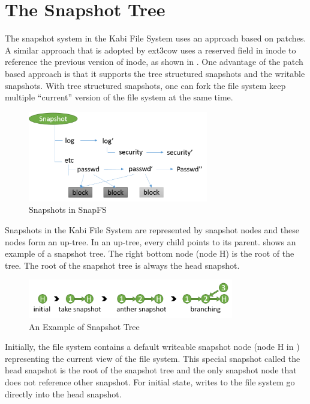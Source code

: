 \section{The Snapshot Tree}

    The snapshot system in the Kabi File System uses an approach based on patches. A similar approach that is adopted by ext3cow uses a reserved field in inode to reference the previous version of inode, as shown in . One advantage of the patch based approach is that it supports the tree structured snapshots and the writable snapshots. With tree structured snapshots, one can fork the file system keep multiple ``current'' version of the file system at the same time.

\begin{figure}[t]
\centering
\includegraphics[width=0.7\textwidth]{Chapter-4/figs/fig24.png}
\caption{Snapshots in SnapFS}
\label{fig:snapfs_approach}
\end{figure}

    Snapshots in the Kabi File System are represented by snapshot nodes and these nodes form an up-tree. In an up-tree, every child points to its parent.  shows an example of a snapshot tree. The right bottom node (node H) is the root of the tree. The root of the snapshot tree is always the head snapshot.

\begin{figure}[t]
\centering
\includegraphics[width=0.8\textwidth]{Chapter-4/figs/fig13.png}
\caption{An Example of Snapshot Tree}
\label{fig:snap_tree_example}
\end{figure}

    Initially, the file system contains a default writeable snapshot node (node H in ) representing the current view of the file system. This special snapshot called the head snapshot is the root of the snapshot tree and the only snapshot node that does not reference other snapshot. For initial state,  writes to the file system go directly into the head snapshot.
    
